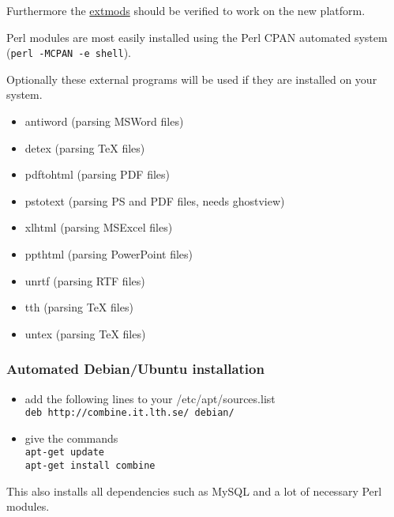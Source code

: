  Furthermore
the \hyperref{external Perl modules}{external Perl modules (listed in }{)}{extmods} should be verified to work
on the new platform.


Perl modules are most easily installed 
using the Perl CPAN automated system\\
({\tt perl -MCPAN -e shell}).

Optionally these external programs will be used if they are 
installed on your system.
\begin{itemize}
 \item antiword (parsing MSWord files)
 \item detex (parsing TeX files)
 \item pdftohtml (parsing PDF files)
 \item pstotext (parsing PS and PDF files, needs ghostview)
 \item xlhtml (parsing MSExcel files)
 \item ppthtml (parsing PowerPoint files)
 \item unrtf (parsing RTF files)
 \item tth (parsing TeX files)
 \item untex (parsing TeX files)
\end{itemize}

\subsubsection{Automated Debian/Ubuntu installation}
\label{debian}
\begin{itemize}
\item add the following lines to your /etc/apt/sources.list\\
{\tt deb http://combine.it.lth.se/ debian/}
\item give the commands\\
{\tt apt-get update\\
apt-get install combine}
\end{itemize}
This also installs all dependencies such as MySQL and a lot of necessary
Perl modules.

